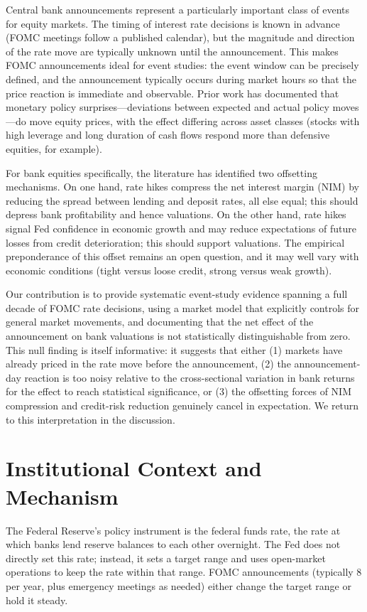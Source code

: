 \documentclass[11pt]{article}
\begin{document}
Central bank announcements represent a particularly important class of events for equity markets. The timing of interest rate decisions is known in advance (FOMC meetings follow a published calendar), but the magnitude and direction of the rate move are typically unknown until the announcement. This makes FOMC announcements ideal for event studies: the event window can be precisely defined, and the announcement typically occurs during market hours so that the price reaction is immediate and observable. Prior work has documented that monetary policy surprises—deviations between expected and actual policy moves—do move equity prices, with the effect differing across asset classes (stocks with high leverage and long duration of cash flows respond more than defensive equities, for example).

For bank equities specifically, the literature has identified two offsetting mechanisms. On one hand, rate hikes compress the net interest margin (NIM) by reducing the spread between lending and deposit rates, all else equal; this should depress bank profitability and hence valuations. On the other hand, rate hikes signal Fed confidence in economic growth and may reduce expectations of future losses from credit deterioration; this should support valuations. The empirical preponderance of this offset remains an open question, and it may well vary with economic conditions (tight versus loose credit, strong versus weak growth).

Our contribution is to provide systematic event-study evidence spanning a full decade of FOMC rate decisions, using a market model that explicitly controls for general market movements, and documenting that the net effect of the announcement on bank valuations is not statistically distinguishable from zero. This null finding is itself informative: it suggests that either (1) markets have already priced in the rate move before the announcement, (2) the announcement-day reaction is too noisy relative to the cross-sectional variation in bank returns for the effect to reach statistical significance, or (3) the offsetting forces of NIM compression and credit-risk reduction genuinely cancel in expectation. We return to this interpretation in the discussion.

\section{Institutional Context and Mechanism}

The Federal Reserve's policy instrument is the federal funds rate, the rate at which banks lend reserve balances to each other overnight. The Fed does not directly set this rate; instead, it sets a target range and uses open-market operations to keep the rate within that range. FOMC announcements (typically 8 per year, plus emergency meetings as needed) either change the target range or hold it steady.
\end{document}
